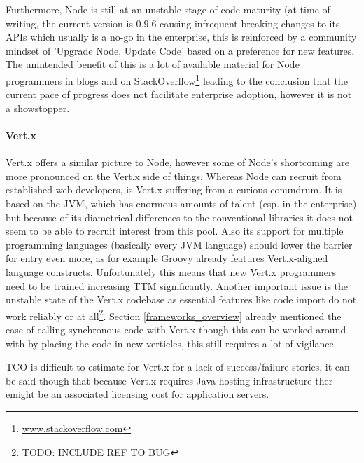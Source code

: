 Furthermore, Node is still at an unstable stage of code maturity (at time of writing, the current version is $0.9.6$ causing infrequent breaking changes to its APIs which usually is a no-go in the enterprise, this is reinforced by a community mindset of 'Upgrade Node, Update Code' based on a preference for new features. The unintended benefit of this is a lot of available material for Node programmers in blogs and on StackOverflow\footnote{\url{www.stackoverflow.com}} leading to the conclusion that the current pace of progress does not facilitate enterprise adoption, however it is not a showstopper.

\paragraph{Vert.x}
Vert.x offers a similar picture to Node, however some of Node's shortcoming are more pronounced on the Vert.x side of things. Whereas Node can recruit from established web developers, is Vert.x suffering from a curious conundrum. It is based on the JVM, which has enormous amounts of talent (esp. in the enterprise) but because of its diametrical differences to the conventional libraries it does not seem to be able to recruit interest from this pool. Also its support for multiple programming languages (basically every JVM language) should lower the barrier for entry even more, as for example Groovy already features Vert.x-aligned language constructs. Unfortunately this means that new Vert.x programmers need to be trained increasing TTM significantly.
Another important issue is the unstable state of the Vert.x codebase as essential features like code import do not work reliably or at all\footnote{TODO: INCLUDE REF TO BUG}. Section \ref{frameworks_overview} already mentioned the ease of calling synchronous code with Vert.x though this can be worked around with by placing the code in new verticles, this still requires a lot of vigilance.

TCO is difficult to estimate for Vert.x for a lack of success/failure stories, it can be said though that because Vert.x requires Java hosting infrastructure ther emight be an associated licensing cost for application servers.



